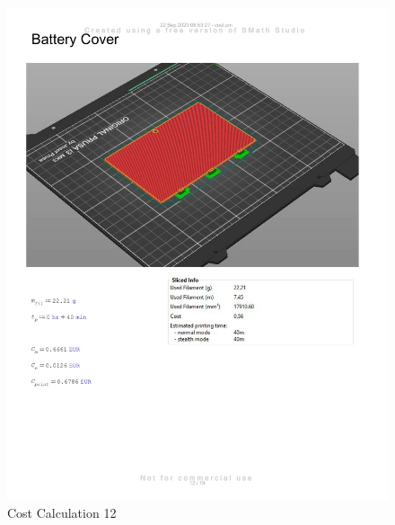 \begin{figure}[H]
    \centering
    \includegraphics[width=\linewidth]{texs/appendix/data/costcalculation/cost1-12.jpg}
    \caption{Cost Calculation 12}
    \label{fig:cost-calculation-12}
\end{figure}

